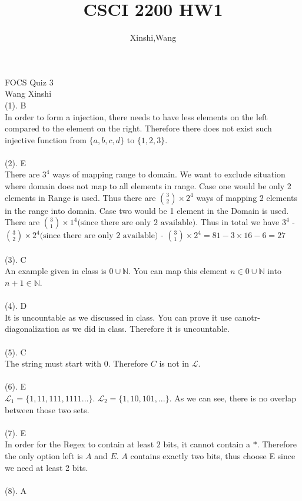 \documentclass{article}
\title{CSCI 2200 HW1}
\author{Xinshi,Wang}
\begin{document}
	\noindent
	FOCS Quiz 3 \\
	Wang Xinshi\\
	
	\noindent (1). B\\
	In order to form a injection, there needs to have less elements on the left compared to the element on the right. Therefore there does not exist such injective function from $\{a,b,c,d\}$ to $\{1,2,3\}$.\\\\
	(2). E\\
	There are $3^4$ ways of mapping range to domain. We want to exclude situation where domain does not map to all elements in range. Case one would be only 2 elements in Range is used. Thus there are $\binom{3}{2} \times 2^4$ ways of mapping 2 elements in the range into domain. Case two would be 1 element in the Domain is used. There are $\binom{3}{1} \times 1^4\text{(since there are only 2 available)}$. Thus in total we have $3^4$ - $\binom{3}{2} \times 2^4\text{(since there are only 2 available)}$ - $\binom{3}{1} \times 2^4 = 81 - 3 \times 16 - 6 = 27$\\\\
	(3). C\\
	An example given in class is ${0} \cup \mathbb{N}$. You can map this element $n \in {0} \cup \mathbb{N}$ into $n+1 \in \mathbb{N}$.\\\\
	(4). D\\
	It is uncountable as we discussed in class. You can prove it use canotr-diagonalization as we did in class. Therefore it is uncountable.\\\\
	(5). C\\ 
	The string must start with $0$. Therefore $C$ is not in $\mathcal{L}$. \\\\
	(6). E\\
	 $\mathcal{L}_1 = \{1,11,111,1111...\}$. $\mathcal{L}_2 = \{1,10,101,...\}$. As we can see, there is no overlap between those two sets.\\\\
	(7). E\\
	In order for the Regex to contain at least $2$ bits, it cannot contain a $*$. Therefore the only option left is $A$ and $E$. $A$ contains exactly two bits, thus choose E since we need at least 2 bits.\\\\
	(8). A\\
\end{document}
